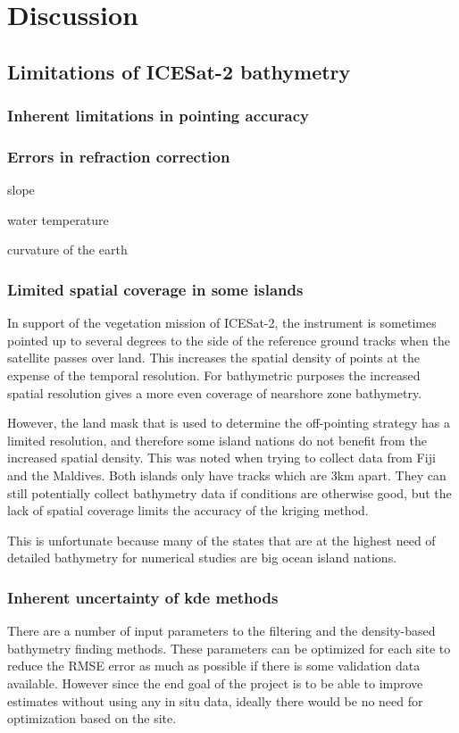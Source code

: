 \chapter{Discussion}


\section{Limitations of ICESat-2 bathymetry}
\subsection{Inherent limitations in pointing accuracy}

\subsection{Errors in refraction correction}
slope

water temperature

curvature of the earth


\subsection{Limited spatial coverage in some islands}

In support of the vegetation mission of ICESat-2, the instrument is sometimes pointed up to several degrees to the side of the reference ground tracks when the satellite passes over land. This increases the spatial density of points at the expense of the temporal resolution. For bathymetric purposes the increased spatial resolution gives a more even  coverage of nearshore zone bathymetry. 

However, the land mask that is used to determine the off-pointing strategy has a limited resolution, and therefore some island nations do not benefit from the increased spatial density. This was noted when trying to collect data from Fiji and the Maldives. Both islands only have tracks which are 3km apart. They can still potentially collect bathymetry data if conditions are otherwise good, but the lack of spatial coverage limits the accuracy of the kriging method.

This is unfortunate because many of the states that are at the highest need of detailed bathymetry for numerical studies are big ocean island nations.

\subsection{Inherent uncertainty of kde methods}
There are a number of input parameters to the filtering and the density-based bathymetry finding methods. These parameters can be optimized for each site to reduce the RMSE error as much as possible if there is some validation data available. However since the end goal of the project is to be able to improve estimates without using any in situ data, ideally there would be no need for optimization based on the site.

